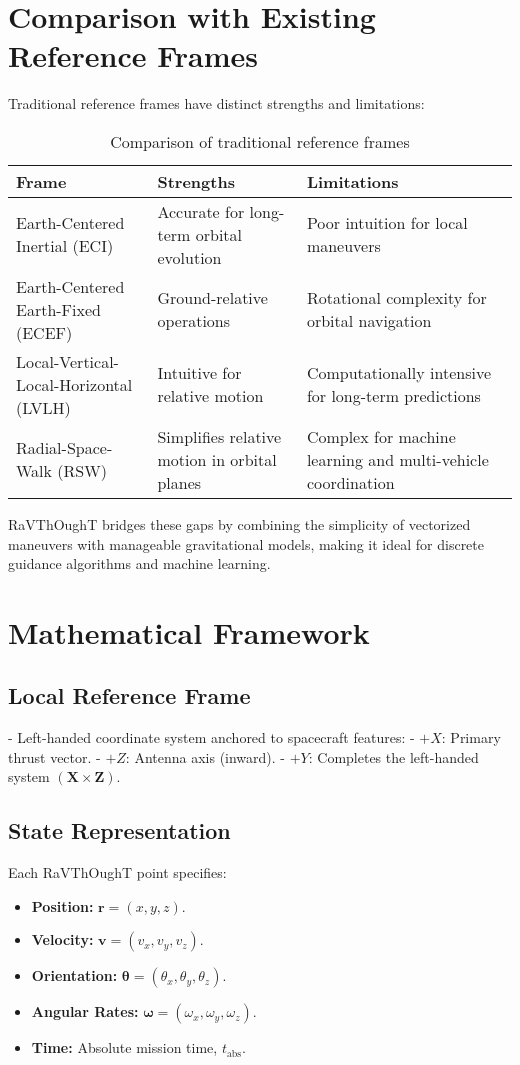 \section{Comparison with Existing Reference Frames}

Traditional reference frames have distinct strengths and limitations:

\begin{table}[h!]
\centering
\begin{tabular}{|l|l|l|}
\hline
\textbf{Frame} & \textbf{Strengths} & \textbf{Limitations} \\
\hline
Earth-Centered Inertial (ECI) & Accurate for long-term orbital evolution & Poor intuition for local maneuvers \\
Earth-Centered Earth-Fixed (ECEF) & Ground-relative operations & Rotational complexity for orbital navigation \\
Local-Vertical-Local-Horizontal (LVLH) & Intuitive for relative motion & Computationally intensive for long-term predictions \\
Radial-Space-Walk (RSW) & Simplifies relative motion in orbital planes & Complex for machine learning and multi-vehicle coordination \\
\hline
\end{tabular}
\caption{Comparison of traditional reference frames}
\end{table}

RaVThOughT bridges these gaps by combining the simplicity of vectorized maneuvers with manageable gravitational models, making it ideal for discrete guidance algorithms and machine learning.

\section{Mathematical Framework}

\subsection{Local Reference Frame}
- Left-handed coordinate system anchored to spacecraft features:
  - \(+X\): Primary thrust vector.
  - \(+Z\): Antenna axis (inward).
  - \(+Y\): Completes the left-handed system \((\mathbf{X} \times \mathbf{Z})\).

\subsection{State Representation}
Each RaVThOughT point specifies:
\begin{itemize}
  \item \textbf{Position:} \(\mathbf{r} = (x, y, z)\).
  \item \textbf{Velocity:} \(\mathbf{v} = (v_x, v_y, v_z)\).
  \item \textbf{Orientation:} \(\boldsymbol{\theta} = (\theta_x, \theta_y, \theta_z)\).
  \item \textbf{Angular Rates:} \(\boldsymbol{\omega} = (\omega_x, \omega_y, \omega_z)\).
  \item \textbf{Time:} Absolute mission time, \(t_{\text{abs}}\).
\end{itemize}

